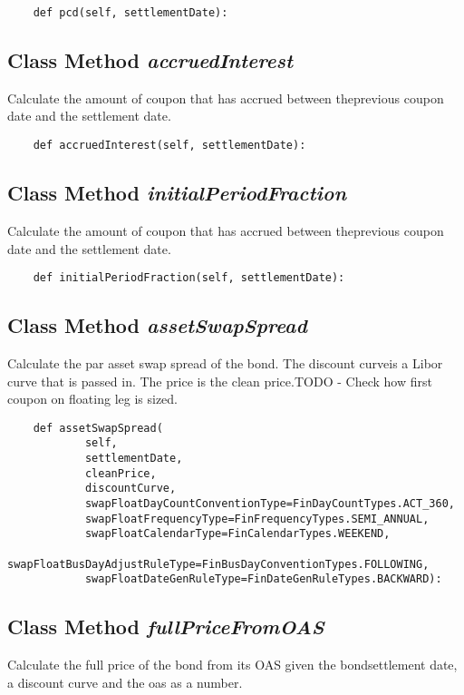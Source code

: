 \documentclass[twoside,11pt]{book}
\begin{document}
\begin{lstlisting}
    def pcd(self, settlementDate):
\end{lstlisting}

\subsection{Class Method {\it accruedInterest}}
Calculate the amount of coupon that has accrued between theprevious coupon date and the settlement date. 

\begin{lstlisting}
    def accruedInterest(self, settlementDate):
\end{lstlisting}

\subsection{Class Method {\it initialPeriodFraction}}
Calculate the amount of coupon that has accrued between theprevious coupon date and the settlement date. 

\begin{lstlisting}
    def initialPeriodFraction(self, settlementDate):
\end{lstlisting}

\subsection{Class Method {\it assetSwapSpread}}
Calculate the par asset swap spread of the bond. The discount curveis a Libor curve that is passed in. The price is the clean price.TODO - Check how first coupon on floating leg is sized. 

\begin{lstlisting}
    def assetSwapSpread(
            self,
            settlementDate,
            cleanPrice,
            discountCurve,
            swapFloatDayCountConventionType=FinDayCountTypes.ACT_360,
            swapFloatFrequencyType=FinFrequencyTypes.SEMI_ANNUAL,
            swapFloatCalendarType=FinCalendarTypes.WEEKEND,
            swapFloatBusDayAdjustRuleType=FinBusDayConventionTypes.FOLLOWING,
            swapFloatDateGenRuleType=FinDateGenRuleTypes.BACKWARD):
\end{lstlisting}

\subsection{Class Method {\it fullPriceFromOAS}}
Calculate the full price of the bond from its OAS given the bondsettlement date, a discount curve and the oas as a number. 
\end{document}
